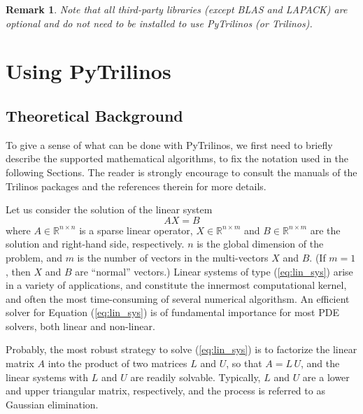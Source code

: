 \documentclass[10pt,relax]{SANDreport}
\newtheorem{remark}{Remark}
\begin{document}
\begin{remark}
Note that all third-party libraries (except BLAS and LAPACK) are optional and
do not need to be installed to use PyTrilinos (or Trilinos).
\end{remark}

\section{Using PyTrilinos}
\label{sec:using}

\subsection{Theoretical Background}
\label{sec:communicators}

To give a sense of what can be done with PyTrilinos, we first need to briefly
describe the supported mathematical algorithms, to fix the notation used in
the following Sections.  The reader is strongly encourage to consult the
manuals of the Trilinos packages and the references therein for more details.

\medskip

Let us consider the solution of the linear system
\begin{equation}
\label{eq:lin_sys}
A X = B
\end{equation}
where $A \in \mathbb{R}^{n \times n}$ is a sparse linear operator, $X \in
\mathbb{R}^{n \times m}$ and $B \in \mathbb{R}^{n \times m}$ are the solution
and right-hand side, respectively. $n$ is the global dimension of the problem,
  and $m$ is the number of vectors in the multi-vectors $X$ and $B$. 
  (If $m = 1$, then $X$ and $B$ are ``normal'' vectors.)
Linear systems of type (\ref{eq:lin_sys}) arise in a variety of applications,
  and constitute the innermost computational kernel, and often the most
  time-consuming of several numerical algorithsm. An efficient solver for
  Equation (\ref{eq:lin_sys}) is of fundamental importance for most PDE
  solvers, both linear and non-linear.

Probably, the most robust strategy to solve (\ref{eq:lin_sys}) is to factorize
the linear matrix $A$ into the product of two matrices $L$ and $U$, so that
$A = L \, U$, and 
the linear systems with $L$ and $U$ are readily solvable. Typically,
$L$ and $U$ are a lower and upper triangular matrix, respectively, and the
process is referred to as Gaussian elimination. 
\end{document}
